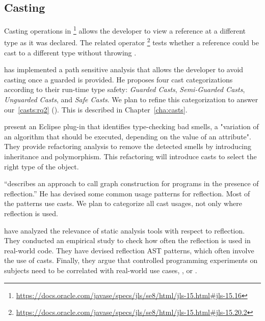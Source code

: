 \subsection{Casting}
\label{sec:lr:casting}

Casting operations in \java
\footnote{\url{https://docs.oracle.com/javase/specs/jls/se8/html/jls-15.html\#jls-15.16}}
allows the developer to view a reference at a different type as it was declared.
The related  operator%
\footnote{\url{https://docs.oracle.com/javase/specs/jls/se8/html/jls-15.html\#jls-15.20.2}}
tests whether a reference could be cast to a different type without
throwing .

\cite{wintherGuardedTypePromotion2011} has implemented a
path sensitive analysis that allows the developer to avoid casting
once a guarded  is provided.
He proposes four cast categorizations according to their
run-time type safety:
\emph{Guarded Casts}, \emph{Semi-Guarded Casts},
\emph{Unguarded Casts}, and \emph{Safe Casts}.
We plan to refine this categorization to answer
our~\ref{casts:rq2} (\emph{\crqB}).
This is described in Chapter~\ref{cha:casts}.

\cite{tsantalisJDeodorantIdentificationRemoval2008} present an
Eclipse plug-in that identifies type-checking bad smells,
a "variation of an algorithm that should be executed,
depending on the value of an attribute".
They provide refactoring analysis to remove the detected smells
by introducing inheritance and polymorphism.
This refactoring will introduce casts to select
the right type of the object.

\cite{livshitsImprovingSoftwareSecurity2006,livshitsReflectionAnalysisJava2005} ``describes an approach to call graph construction for \java{} programs in the presence of reflection.''
He has devised some common usage patterns for reflection.
Most of the patterns use casts.
We plan to categorize all cast usages,
not only where reflection is used.

\cite{landmanChallengesStaticAnalysis2017} have analyzed the relevance of
static analysis tools with respect to reflection.
They conducted an empirical study to check how often the reflection
\api{} is used in real-world code.
They have devised reflection AST patterns,
which often involve the use of casts.
Finally, they argue that controlled programming experiments on
subjects need to be correlated with real-world use cases,
\eg, \github{} or \mavencentral{}.

